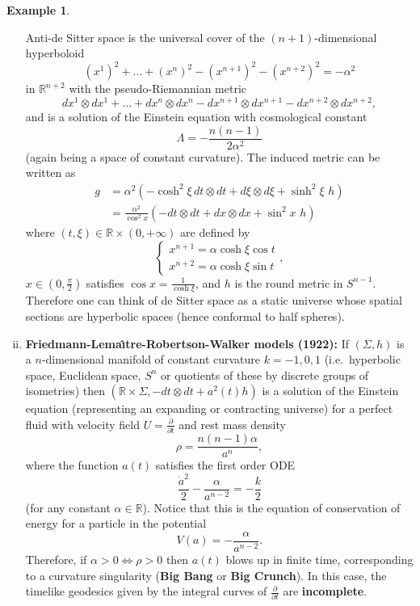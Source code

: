 \documentclass[12pt]{amsart}
\newcommand{\bbR}{\mathbb{R}}      %
\theoremstyle{definition}
\newtheorem{Example}[Thm]{Example}
\theoremstyle{remark}
\begin{document}
\begin{Example}
\begin{enumerate}[(i)]
Anti-de Sitter space is the universal cover of the $(n+1)$-dimensional hyperboloid
\[
(x^1)^2 + \ldots + (x^n)^2 - (x^{n+1})^2 - (x^{n+2})^2 = - \alpha^2
\]
in $\bbR^{n+2}$ with the pseudo-Riemannian metric
\[
dx^1 \otimes dx^1 + \ldots + dx^n \otimes dx^n - dx^{n+1} \otimes dx^{n+1} - dx^{n+2} \otimes dx^{n+2},
\]
and is a solution of the Einstein equation with cosmological constant 
\[
\Lambda=-\frac{n(n-1)}{2\alpha^2}
\]
(again being a space of constant curvature). The induced metric can be written as
\begin{align*}
g & =  \alpha^2 \left( - \cosh^2 \xi \, dt \otimes dt +  d\xi \otimes d\xi +\sinh^2 \xi  \,\, h \right) \\
& = \frac{\alpha^2}{\cos^2 x} \left(- dt \otimes dt + dx \otimes dx + \sin^2 x \,\, h \right)
\end{align*}
where $(t,\xi) \in \bbR \times \left(0,+\infty\right)$ are defined by 
\[
\begin{cases}
x^{n+1}=\alpha \cosh \xi \cos t\\
x^{n+2}=\alpha \cosh \xi \sin t
\end{cases},
\]
$x \in \left(0,\frac\pi2\right)$ satisfies $\cos x = \frac1{\cosh \xi}$, and $h$ is the round metric in $S^{n-1}$. Therefore one can think of de Sitter space as a static universe whose spatial sections are hyperbolic spaces (hence conformal to half spheres).

\item
{\bf Friedmann-Lema\^\i tre-Robertson-Walker models (1922):} If $(\Sigma,h)$ is a $n$-dimensional manifold of constant curvature $k=-1,0,1$ (i.e.~hyperbolic space, Euclidean space, $S^n$ or quotients of these by discrete groups of isometries) then $(\bbR \times \Sigma, -dt \otimes dt + a^2(t) h)$ is a solution of the Einstein equation (representing an expanding or contracting universe) for a perfect fluid with velocity field $U = \frac{\partial}{\partial t}$ and rest mass density
\[
\rho = \frac{n(n-1) \alpha}{a^n},
\]
where the function $a(t)$ satisfies the first order ODE
\[
\frac{\dot{a}^2}{2} - \frac{\alpha}{a^{n-2}} = - \frac{k}2
\]
(for any constant $\alpha \in \bbR$). Notice that this is the equation of conservation of energy for a particle in the potential
\[
V(a) = - \frac{\alpha}{a^{n-2}}.
\]
Therefore, if $\alpha>0 \Leftrightarrow \rho > 0$ then $a(t)$ blows up in finite time, corresponding to a curvature singularity ({\bf Big Bang} or {\bf Big Crunch}). In this case, the timelike geodesics given by the integral curves of $\frac{\partial}{\partial t}$ are {\bf incomplete}.
\end{enumerate}
\end{Example}
\end{document}

